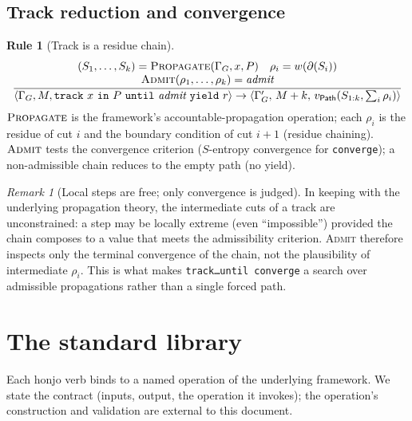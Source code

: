 \documentclass[11pt,a4paper]{article}
\theoremstyle{thmstyle}
\theoremstyle{definition}
\newtheorem{rulename}[theorem]{Rule}
\theoremstyle{remark}
\newtheorem{remark}[theorem]{Remark}
\newcommand{\res}{\rho}
\newcommand{\cut}{\partial}
\newcommand{\hj}[1]{\texttt{#1}}
\begin{document}
\subsection{Track reduction and convergence}

\begin{rulename}[Track is a residue chain]
\label{rule:track-step}
\[
\frac{\begin{array}{c}
       (S_1,\dots,S_k)=\textsc{Propagate}(\Gamma_G,x,P)\quad
       \res_i=w(\cut(S_i))\\
       \textsc{Admit}(\res_1,\dots,\res_k)=\textit{admit}
      \end{array}}
     {\langle\Gamma_G,M,\hj{track}\ x\ \hj{in}\ P\ \hj{until}\ \textit{admit}\ \hj{yield}\ r\rangle
      \to \langle\Gamma_G',\,M+k,\,
      v_{\mathsf{Path}}(S_{1:k},\textstyle\sum_i\res_i)\rangle}
\]
$\textsc{Propagate}$ is the framework's accountable-propagation operation;
each $\res_i$ is the residue of cut $i$ and the boundary condition of cut
$i{+}1$ (residue chaining). $\textsc{Admit}$ tests the convergence
criterion ($S$-entropy convergence for \hj{converge}); a non-admissible
chain reduces to the empty path (no yield).
\end{rulename}

\begin{remark}[Local steps are free; only convergence is judged]
\label{rem:local-free}
In keeping with the underlying propagation theory, the intermediate cuts
of a track are unconstrained: a step may be locally extreme (even
``impossible'') provided the chain composes to a value that meets the
admissibility criterion. \textsc{Admit} therefore inspects only the
terminal convergence of the chain, not the plausibility of intermediate
$\res_i$. This is what makes \hj{track\ldots until\ converge} a search over
admissible propagations rather than a single forced path.
\end{remark}

\section{The standard library}
\label{sec:stdlib}

Each honjo verb binds to a named operation of the underlying framework.
We state the contract (inputs, output, the operation it invokes); the
operation's construction and validation are external to this document.
\end{document}
